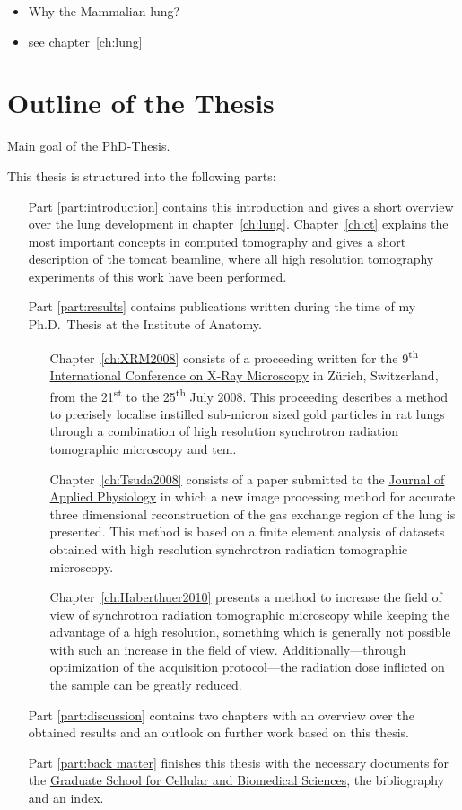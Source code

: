 \begin{itemize}
	\item Why the Mammalian lung?
	\item see chapter~\ref{ch:lung}
\end{itemize}

\section{Outline of the Thesis}
Main goal of the PhD-Thesis.

This thesis is structured into the following parts:

\begin{itemize}
	\item [Part \ref{part:introduction}] contains this introduction and gives a short overview over the lung development in chapter~\ref{ch:lung}. Chapter~\ref{ch:ct} explains the most important concepts in computed tomography and gives a short description of the \acf{tomcat} beamline, where all high resolution tomography experiments of this work have been performed.

	\item [Part \ref{part:results}] contains publications written during the time of my Ph.D.\ Thesis at the Institute of Anatomy.

	\begin{itemize}
		\item [Chapter~\ref{ch:XRM2008}] consists of a proceeding written for the 9\textsuperscript{th} \href{http://xrm2008.web.psi.ch/}{International Conference on X-Ray Microscopy} in Zürich, Switzerland, from the 21\textsuperscript{st} to the 25\textsuperscript{th} July 2008. This proceeding describes a method to precisely localise instilled sub-micron sized gold particles in rat lungs through a combination of high resolution synchrotron radiation tomographic microscopy and \acl{tem}.
		\item [Chapter~\ref{ch:Tsuda2008}] consists of a paper submitted to the \href{http://jap.physiology.org/}{Journal of Applied Physiology} in which a new image processing method for accurate three dimensional reconstruction of the gas exchange region of the lung is presented. This method is based on a finite element analysis of datasets obtained with high resolution synchrotron radiation tomographic microscopy.
		\item [Chapter~\ref{ch:Haberthuer2010}] presents a method to increase the field of view of synchrotron radiation tomographic microscopy while keeping the advantage of a high resolution, something which is generally not possible with such an increase in the field of view. Additionally---through optimization of the acquisition protocol---the radiation dose inflicted on the sample can be greatly reduced.
	\end{itemize}
	\item [Part \ref{part:discussion}] contains two chapters with an overview over the obtained results and an outlook on further work based on this thesis.

	\item [Part \ref{part:back matter}] finishes this thesis with the necessary documents for the \href{http://www.gcb.unibe.ch}{Graduate School for Cellular and Biomedical Sciences}, the bibliography and an index.
\end{itemize}